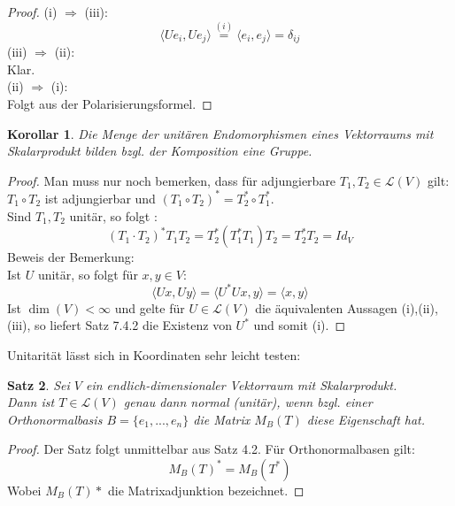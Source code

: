 \documentclass[12pt,a4paper]{article}
\newtheorem{theorem}{Satz}
\newtheorem{corollary}[theorem]{Korollar}
\theoremstyle{definition}
\theoremstyle{remark}
\begin{document}
	\begin{proof}
		(i) $\Rightarrow$ (iii): \\
		\begin{equation}
			\langle Ue_i,Ue_j \rangle \overset{(i)}{=} \langle e_i,e_j \rangle = \delta_{ij}
		\end{equation}		
		(iii) $\Rightarrow$ (ii): \\
		Klar.\\
		(ii) $\Rightarrow$ (i): \\
		Folgt aus der Polarisierungsformel.
	\end{proof}
	
	\begin{corollary}
		Die Menge der unitären Endomorphismen eines Vektorraums mit Skalarprodukt bilden bzgl. der Komposition eine Gruppe.
	\end{corollary}
	
	\begin{proof}
		Man muss nur noch bemerken, dass für adjungierbare $T_1, T_2 \in \mathcal{L}(V)$ gilt: \\
		$T_1 \circ T_2$ ist adjungierbar und $(T_1 \circ T_2)^* = T_2^* \circ T_1^*$. \\
		Sind $T_1, T_2$ unitär, so folgt :
		\begin{equation}
			(T_1 \cdot T_2)^* T_1 T_2 = T_2^*(T_1^*T_1)T_2 = T_2^*T_2=Id_V
		\end{equation}
		Beweis der Bemerkung: \\
		Ist $U$ unitär, so folgt für $x,y \in V$:
		\begin{equation}
			\langle Ux,Uy \rangle = \langle U^*Ux,y \rangle =\langle x,y \rangle
		\end{equation}
		Ist $\dim (V)<\infty$ und gelte für $U \in \mathcal{L}(V)$ die äquivalenten Aussagen (i),(ii),(iii), so liefert Satz 7.4.2 die Existenz von $U^*$ und somit (i).
	\end{proof}	
	
	Unitarität lässt sich in Koordinaten sehr leicht testen:
	
	\begin{theorem}
		Sei $V$ ein endlich-dimensionaler Vektorraum mit Skalarprodukt. \\
		Dann ist $T \in \mathcal{L}(V)$ genau dann normal (unitär), wenn bzgl. einer Orthonormalbasis $B=\{e_1,...,e_n  \}$ die Matrix $M_B(T)$ diese Eigenschaft hat.
	\end{theorem}
	
	\begin{proof}
		Der Satz folgt unmittelbar aus Satz 4.2. Für Orthonormalbasen gilt: \\
		\begin{equation}
			M_B(T)^* = M_B(T^*)
		\end{equation}
		Wobei $M_B(T)*$ die Matrixadjunktion bezeichnet.
	\end{proof}		
	
\end{document}

